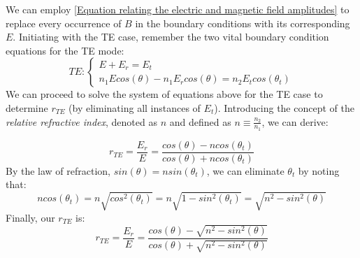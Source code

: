 We can employ \ref{Equation relating the electric and magnetic field amplitudes} to replace every occurrence of \(B\) in the boundary conditions with its corresponding \(E\). Initiating with the TE case, remember the two vital boundary condition equations for the TE mode:
\begin{equation}
TE:
\begin{cases} \label{TE boundary conditions}
  E + E_r = E_t \\
  n_1Ecos(\theta) - n_1E_rcos(\theta) = n_2E_tcos(\theta_t)
\end{cases}
\end{equation}
We can proceed to solve the system of equations above for the TE case to determine $r_{TE}$ (by eliminating all instances of $E_t$). Introducing the concept of the \textit{relative refractive index}, denoted as $n$ and defined as $n \equiv \frac{n_2}{n_1}$, we can derive:

\begin{equation} \label{Reflection coefficient (TE) in terms of n}
r_{TE} = \frac{E_r}{E} = \frac{cos(\theta) - ncos(\theta_t)}{cos(\theta) + ncos(\theta_t)}
\end{equation}
By the law of refraction, $sin(\theta) = nsin(\theta_t)$, we can eliminate $\theta_t$ by noting that:
\begin{equation} \label{Replacing \theta_t using the law of refraction}
ncos(\theta_t) = n \sqrt{cos^{2}(\theta_t)} = n\sqrt{1 - sin^2(\theta_t)} = \sqrt{n^2 - sin^2(\theta)}
\end{equation}
Finally, our $r_{TE}$ is:
\begin{equation} \label{Reflection coefficient (TE) without \theta_t}
r_{TE} = \frac{E_r}{E} = \frac{cos(\theta) - \sqrt{n^2 - sin^2(\theta)}}{cos(\theta) + \sqrt{n^2 - sin^2(\theta)}}
\end{equation}

